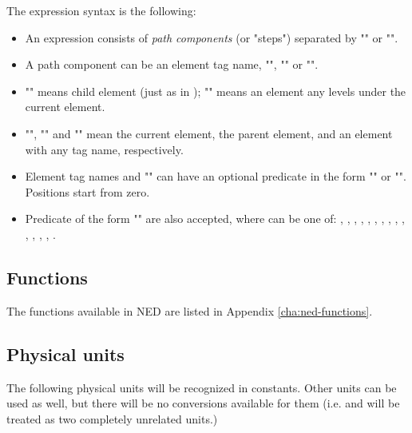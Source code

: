 The expression syntax is the following:
\begin{itemize}
  \item An expression consists of \textit{path components} (or "steps")
        separated by "\ttt{/}" or "\ttt{//}".
  \item A path component can be an element tag name, "\ttt{*}", ""
        or "".
  \item "\ttt{/}" means child element (just as in );
        "\ttt{//}" means an element any levels under the current element.
  \item "", "" and "\ttt{*}" mean the current element,
        the parent element, and an element with any tag name, respectively.
  \item Element tag names and "\ttt{*}" can have an optional predicate
        in the form "\ttt{[position]}" or "\ttt{[@attribute='value']}".
        Positions start from zero.
  \item Predicate of the form "\ttt{[@attribute=\textit{\$param}]}" are also
        accepted, where  can be one of:
        ,
        ,
        ,
        ,
        ,
        ,
        ,
        ,
        ,
        ,
        ,
        ,
        ,
        ,
        .
\end{itemize}

\subsection{Functions}

The functions available in NED are listed in Appendix
\ref{cha:ned-functions}.

\subsection{Physical units}
\label{ch-ned-ref:sec:units}

The following physical units will be recognized in constants. Other units can
be used as well, but there will be no conversions available for them (i.e.
 and  will be treated as two completely unrelated
units.)

